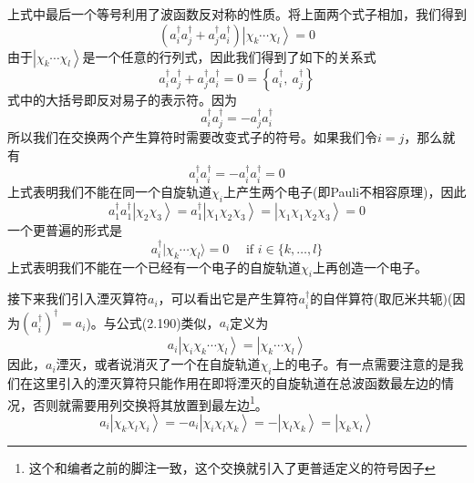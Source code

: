 \documentclass[12pt,a4paper,openany,twoside]{book}
\numberwithin{equation}{section}
\begin{document}
          上式中最后一个等号利用了波函数反对称的性质。将上面两个式子相加，我们得到
          \begin{equation}
            \left(a_i^{\dagger}a_j^{\dagger}+a_j^{\dagger}a_i^{\dagger}\right)
            \left|\chi_k\cdots\chi_l\right\rangle=0
          \end{equation}
          由于$\left|\chi_k\cdots\chi_l\right\rangle$是一个任意的行列式，因此我们得到了如下的关系式
          \begin{equation}
            a_i^{\dagger}a_j^{\dagger}+a_j^{\dagger}a_i^{\dagger}=0=\left\{a_i^{\dagger},\ a_j^{\dagger}\right\}
            \label{anti commutator creation}
          \end{equation}
          式中的大括号即反对易子的表示符。因为
          \begin{equation}
            a_{i}^{\dagger} a_{j}^{\dagger}=-a_{j}^{\dagger} a_{i}^{\dagger}
          \end{equation}
          所以我们在交换两个产生算符时需要改变式子的符号。如果我们令$i=j$，那么就有
          \begin{equation}
            a_{i}^{\dagger} a_{i}^{\dagger}=-a_{i}^{\dagger} a_{i}^{\dagger}=0
          \end{equation}
          上式表明我们不能在同一个自旋轨道$\chi_i$上产生两个电子(即Pauli不相容原理)，因此
          \begin{equation}
            a_1^{\dagger}a_1^{\dagger}\left|\chi_2\chi_3\right\rangle=a_1^{\dagger}\left|\chi_1\chi_2\chi_3\right\rangle=\left|\chi_1\chi_1\chi_2\chi_3\right\rangle=0
          \end{equation}
          一个更普遍的形式是
          \begin{equation}
            a_{i}^{\dagger} | \chi_{k} \cdots \chi_{l} \rangle=0 \quad \text { if } i \in\{k, \ldots, l\}
          \end{equation}
          上式表明我们不能在一个已经有一个电子的自旋轨道$\chi_i$上再创造一个电子。
          
          接下来我们引入湮灭算符$a_i$，可以看出它是产生算符$a_i^{\dagger}$的自伴算符(取厄米共轭)(因为$(a_i^{\dagger})^\dagger=a_i$)。与公式(2.190)类似，$a_i$定义为
          \begin{equation}
            a_i\left|\chi_i\chi_k\cdots\chi_l\right\rangle=\left|\chi_k\cdots\chi_l\right\rangle
            \label{annihilation operator}
          \end{equation}
          因此，$a_i$湮灭，或者说消灭了一个在自旋轨道$\chi_i$上的电子。有一点需要注意的是我们在这里引入的湮灭算符只能作用在即将湮灭的自旋轨道在总波函数最左边的情况，否则就需要用列交换将其放置到最左边\footnote{这个和编者之前的脚注一致，这个交换就引入了更普适定义的符号因子}。
          \begin{equation}
            a_i\left|\chi_k\chi_l\chi_i\right\rangle=-a_i\left|\chi_i\chi_l\chi_k\right\rangle
            =-\left|\chi_l\chi_k\right\rangle=\left|\chi_k\chi_l\right\rangle
          \end{equation}
          
\end{document}
